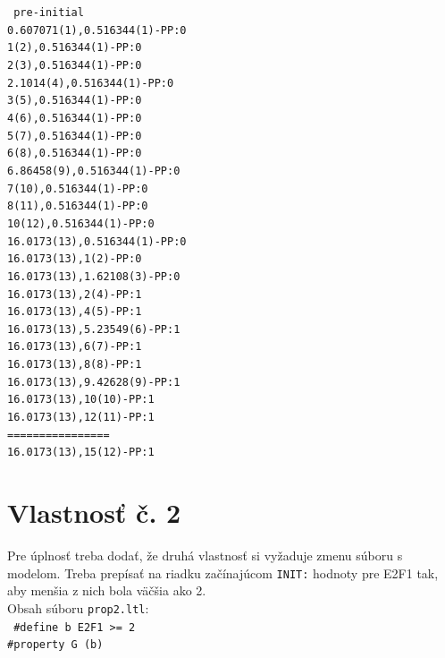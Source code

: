 \documentclass[11pt,final,oneside]{fithesis}
\begin{document}
{\tt\noindent
pre-initial\\
0.607071(1),0.516344(1)-PP:0\\
1(2),0.516344(1)-PP:0\\
2(3),0.516344(1)-PP:0\\
2.1014(4),0.516344(1)-PP:0\\
3(5),0.516344(1)-PP:0\\
4(6),0.516344(1)-PP:0\\
5(7),0.516344(1)-PP:0\\
6(8),0.516344(1)-PP:0\\
6.86458(9),0.516344(1)-PP:0\\
7(10),0.516344(1)-PP:0\\
8(11),0.516344(1)-PP:0\\
10(12),0.516344(1)-PP:0\\
16.0173(13),0.516344(1)-PP:0\\
16.0173(13),1(2)-PP:0\\
16.0173(13),1.62108(3)-PP:0\\
16.0173(13),2(4)-PP:1\\
16.0173(13),4(5)-PP:1\\
16.0173(13),5.23549(6)-PP:1\\
16.0173(13),6(7)-PP:1\\
16.0173(13),8(8)-PP:1\\
16.0173(13),9.42628(9)-PP:1\\
16.0173(13),10(10)-PP:1\\
16.0173(13),12(11)-PP:1\\
================\\
16.0173(13),15(12)-PP:1\\
}


\chapter{Vlastnos\v t \v c. 2}
\label{sec:caseProp2File}
Pre \'uplnos\v t treba doda\v t, \v ze druh\'a vlastnos\v t si vy\v zaduje zmenu s\'uboru s modelom. Treba prep\'isa\v t na riadku za\v c\'inaj\'ucom 
{\tt INIT:} hodnoty pre {E2F1} tak, aby men\v sia z nich bola v\"a\v c\v sia ako 2.\\

\noindent
Obsah s\'uboru {\tt prop2.ltl}:\\

{\tt
\noindent
\#define b E2F1 >= 2\\

\noindent
\#property G (b)\\
}
\end{document}
